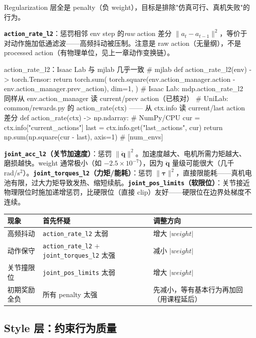 Regularization 层全是 penalty（负 weight），目标是排除"仿真可行、真机失败"的行为。

\textbf{\texttt{action\_rate\_l2}}：惩罚相邻 env step 的\emph{raw} action 差分 $\lVert a_t-a_{t-1}\rVert^2$，等价于对动作施加低通滤波——高频抖动被压制。注意是 raw action（无量纲），不是 processed action（有物理单位，见上一章动作变换链）。

\begin{codebox}[Python]{action\_rate\_l2：Isaac Lab 与 mjlab 几乎一致}
# mjlab
def action_rate_l2(env) -> torch.Tensor:
    return torch.sum(
        torch.square(env.action_manager.action - env.action_manager.prev_action),
        dim=1,
    )
# Isaac Lab: mdp.action_rate_l2 同样从 env.action_manager 读 current/prev action（已核对）
# UniLab: common/rewards.py 的 action_rate(ctx) —— 从 ctx.info 读 current/last action 差分
def action_rate(ctx) -> np.ndarray:                      # NumPy/CPU
    cur  = ctx.info["current_actions"]
    last = ctx.info.get("last_actions", cur)
    return np.sum(np.square(cur - last), axis=1)         # [num_envs]
\end{codebox}

\textbf{\texttt{joint\_acc\_l2}（关节加速度）}：惩罚 $\lVert\ddot{\mathbf q}\rVert^2$。加速度越大、电机所需力矩越大、磨损越快。weight 通常极小（如 $-2.5\times10^{-7}$），因为 $\ddot{\mathbf q}$ 量级可能很大（几千 rad/s$^2$）。\textbf{\texttt{joint\_torques\_l2}（力矩/能耗）}：惩罚 $\lVert\boldsymbol\tau\rVert^2$，直接限能耗——真机电池有限，过大力矩导致发热、缩短续航。\textbf{\texttt{joint\_pos\_limits}（软限位）}：关节接近物理限位时施加递增惩罚，比硬限位（直接 clip）友好——硬限位在边界处梯度不连续。

\begin{center}
\small
\begin{tabular}{@{}lll@{}}
\toprule
现象 & 首先怀疑 & 调整方向 \\
\midrule
高频抖动 & \verb|action_rate_l2| 太弱 & 增大 $|weight|$ \\
动作保守 & \verb|action_rate_l2| $+$ \verb|joint_torques_l2| 太强 & 减小 $|weight|$ \\
关节撞限位 & \verb|joint_pos_limits| 太弱 & 增大 $|weight|$ \\
初期奖励全负 & 所有 penalty 太强 & 先减小，等有基本行为再加回（用课程延后） \\
\bottomrule
\end{tabular}
\end{center}

\subsection{Style 层：约束行为质量}
\label{sec:rlmc-rew-style}

